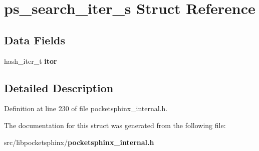 \section{ps\+\_\+search\+\_\+iter\+\_\+s Struct Reference}
\label{structps__search__iter__s}
\subsection*{Data Fields}
\begin{DoxyCompactItemize}
\item 
hash\+\_\+iter\+\_\+t {\bfseries itor}\label{structps__search__iter__s_a08c98d4145043af325263a80020758f7}

\end{DoxyCompactItemize}


\subsection{Detailed Description}


Definition at line 230 of file pocketsphinx\+\_\+internal.\+h.



The documentation for this struct was generated from the following file\+:\begin{DoxyCompactItemize}
\item 
src/libpocketsphinx/{\bf pocketsphinx\+\_\+internal.\+h}\end{DoxyCompactItemize}
